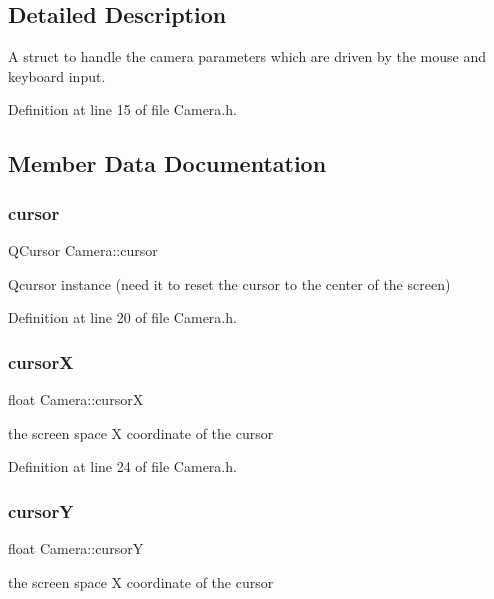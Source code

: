\subsection{Detailed Description}
A struct to handle the camera parameters which are driven by the mouse and keyboard input. 

Definition at line 15 of file Camera.\+h.



\subsection{Member Data Documentation}
\mbox{\label{struct_camera_ae3146e9055b472147b4911aef64135fe}} 
\subsubsection{cursor}
{\footnotesize\ttfamily Q\+Cursor Camera\+::cursor}



Qcursor instance (need it to reset the cursor to the center of the screen) 



Definition at line 20 of file Camera.\+h.

\mbox{\label{struct_camera_a5e8bf29b7ca66b211c99693a7ecdb764}} 
\subsubsection{cursorX}
{\footnotesize\ttfamily float Camera\+::cursorX}



the screen space X coordinate of the cursor 



Definition at line 24 of file Camera.\+h.

\mbox{\label{struct_camera_ae36962da8f699c5635dc6ea750400983}} 
\subsubsection{cursorY}
{\footnotesize\ttfamily float Camera\+::cursorY}



the screen space X coordinate of the cursor 



